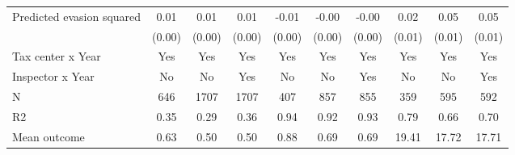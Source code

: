 \begin{tabular}{lccc|ccc|ccc}
\addlinespace
Predicted evasion squared&        0.01\sym{***}&        0.01\sym{***}&        0.01\sym{***}&       -0.01\sym{***}&       -0.00\sym{***}&       -0.00\sym{***}&        0.02\sym{*}  &        0.05\sym{***}&        0.05\sym{***}\\
            &      (0.00)         &      (0.00)         &      (0.00)         &      (0.00)         &      (0.00)         &      (0.00)         &      (0.01)         &      (0.01)         &      (0.01)         \\
\midrule
Tax center x Year&         Yes         &         Yes         &         Yes         &         Yes         &         Yes         &         Yes         &         Yes         &         Yes         &         Yes         \\
Inspector x Year&          No         &          No         &         Yes         &          No         &          No         &         Yes         &          No         &          No         &         Yes         \\
N           &         646         &        1707         &        1707         &         407         &         857         &         855         &         359         &         595         &         592         \\
R2          &        0.35         &        0.29         &        0.36         &        0.94         &        0.92         &        0.93         &        0.79         &        0.66         &        0.70         \\
Mean outcome&        0.63         &        0.50         &        0.50         &        0.88         &        0.69         &        0.69         &       19.41         &       17.72         &       17.71         \\
\bottomrule \end{tabular}
